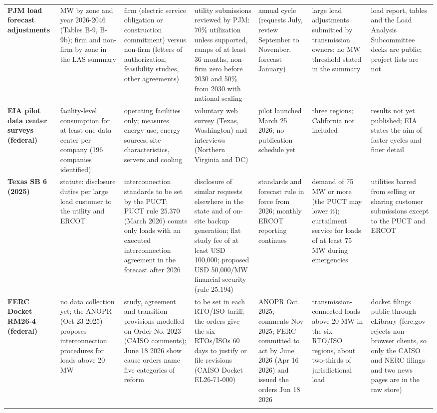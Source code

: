 \begin{tabular}{p{2.4cm}p{3.1cm}p{3.4cm}p{3.6cm}p{2.6cm}p{2.6cm}p{2.6cm}}
\addlinespace
\textbf{PJM load forecast adjustments} & MW by zone and year 2026-2046 (Tables B-9, B-9b); firm and non-firm by zone in the LAS summary & firm (electric service obligation or construction commitment) versus non-firm (letters of authorization, feasibility studies, other agreements) & utility submissions reviewed by PJM: 70\% utilization unless supported, ramps of at least 36 months, non-firm zero before 2030 and 50\% from 2030 with national scaling & annual cycle (requests July, review September to November, forecast January) & large load adjustments submitted by transmission owners; no MW threshold stated in the summary & load report, tables and the Load Analysis Subcommittee decks are public; project lists are not \\
\addlinespace
\textbf{EIA pilot data center surveys (federal)} & facility-level consumption for at least one data center per company (196 companies identified) & operating facilities only; measures energy use, energy sources, site characteristics, servers and cooling & voluntary web survey (Texas, Washington) and interviews (Northern Virginia and DC) & pilot launched March 25 2026; no publication schedule yet & three regions; California not included & results not yet published; EIA states the aim of faster cycles and finer detail \\
\addlinespace
\textbf{Texas SB 6 (2025)} & statute: disclosure duties per large load customer to the utility and ERCOT & interconnection standards to be set by the PUCT; PUCT rule 25.370 (March 2026) counts only loads with an executed interconnection agreement in the forecast after 2026 & disclosure of similar requests elsewhere in the state and of on-site backup generation; flat study fee of at least USD 100,000; proposed USD 50,000/MW financial security (rule 25.194) & standards and forecast rule in force from 2026; monthly ERCOT reporting continues & demand of 75 MW or more (the PUCT may lower it); curtailment service for loads of at least 75 MW during emergencies & utilities barred from selling or sharing customer submissions except to the PUCT and ERCOT \\
\addlinespace
\textbf{FERC Docket RM26-4 (federal)} & no data collection yet; the ANOPR (Oct 23 2025) proposes interconnection procedures for loads above 20 MW & study, agreement and transition provisions modelled on Order No. 2023 (CAISO comments); June 18 2026 show cause orders name five categories of reform & to be set in each RTO/ISO tariff; the orders give the six RTOs/ISOs 60 days to justify or file revisions (CAISO Docket EL26-71-000) & ANOPR Oct 2025; comments Nov 2025; FERC committed to act by June 2026 (Apr 16 2026) and issued the orders Jun 18 2026 & transmission-connected loads above 20 MW in the six RTO/ISO regions, about two-thirds of jurisdictional load & docket filings public through eLibrary (ferc.gov rejects non-browser clients, so only the CAISO and NERC filings and two news pages are in the raw store) \\
\addlinespace
\bottomrule
\end{tabular}